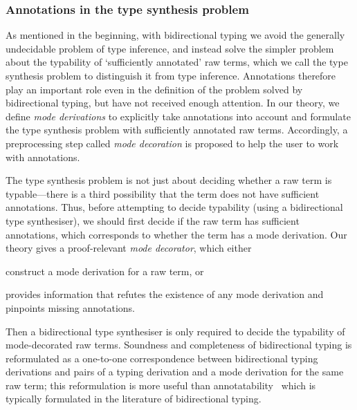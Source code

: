 \subsubsection{Annotations in the type synthesis problem}

As mentioned in the beginning, with bidirectional typing we avoid the generally undecidable problem of type inference, and instead solve the simpler problem about the typability of `sufficiently annotated' raw terms, which we call the type synthesis problem to distinguish it from type inference.
Annotations therefore play an important role even in the definition of the problem solved by bidirectional typing, but have not received enough attention.
In our theory, we define \emph{mode derivations} to explicitly take annotations into account and formulate the type synthesis problem with sufficiently annotated raw terms.
Accordingly, a preprocessing step called \emph{mode decoration} is proposed to help the user to work with annotations.

The type synthesis problem is not just about deciding whether a raw term is typable---there is a third possibility that the term does not have sufficient annotations.
Thus, before attempting to decide typability (using a bidirectional type synthesiser), we should first decide if the raw term has sufficient annotations, which corresponds to whether the term has a mode derivation.
Our theory gives a proof-relevant \emph{mode decorator}, which either
\begin{inlineenum}
  \item construct a mode derivation for a raw term, or
  \item provides information that refutes the existence of any mode derivation and pinpoints missing annotations.
\end{inlineenum}
Then a bidirectional type synthesiser is only required to decide the typability of mode-decorated raw terms.
Soundness and completeness of bidirectional typing is reformulated as a one-to-one correspondence between bidirectional typing derivations and pairs of a typing derivation and a mode derivation for the same raw term; this reformulation is more useful than annotatability~\cite[Section~3.2]{Dunfield2021} which is typically formulated in the literature of bidirectional typing.


